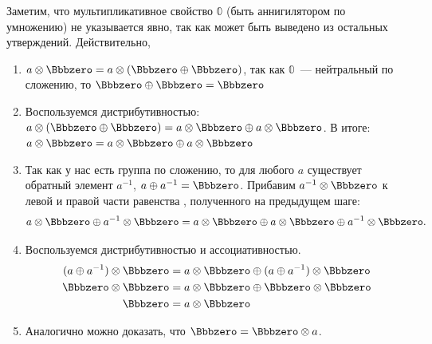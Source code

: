 Заметим, что мультипликативное свойство $\Bbbzero$ (быть аннигилятором по умножению) не указывается явно, так как может быть выведено из остальных утверждений.
Действительно,
\begin{enumerate}
    \item $a \opMult \Bbbzero = a \opMult (\Bbbzero \opAdd \Bbbzero)$, так как $\Bbbzero$~--- нейтральный по сложению, то $\Bbbzero \opAdd \Bbbzero = \Bbbzero$
    \item Воспользуемся дистрибутивностью: $a \opMult (\Bbbzero \opAdd \Bbbzero) = a \opMult \Bbbzero \opAdd a \opMult \Bbbzero$.
          В итоге: $a \opMult \Bbbzero = a \opMult \Bbbzero \opAdd a \opMult \Bbbzero$
    \item Так как у нас есть группа по сложению, то для любого $a$ существует обратный элемент $a^{-1}$, $a \opAdd a^{-1} = \Bbbzero$.
          Прибавим $a^{-1} \opMult \Bbbzero$ к левой и правой части равенства%
          , полученного на предыдущем шаге:
          \[a \opMult \Bbbzero \opAdd a^{-1} \opMult \Bbbzero = a \opMult \Bbbzero \opAdd a \opMult \Bbbzero \opAdd a^{-1} \opMult \Bbbzero.\]
    \item Воспользуемся дистрибутивностью и ассоциативностью.
          \begin{align*}
              (a \opAdd a^{-1}) \opMult \Bbbzero & = a \opMult \Bbbzero \opAdd (a  \opAdd a^{-1}) \opMult \Bbbzero \\
              \Bbbzero \opMult \Bbbzero          & = a \opMult \Bbbzero \opAdd \Bbbzero \opMult \Bbbzero           \\
              \Bbbzero                           & = a \opMult \Bbbzero
          \end{align*}
    \item Аналогично можно доказать, что $\Bbbzero = \Bbbzero \opMult a$.
\end{enumerate}

